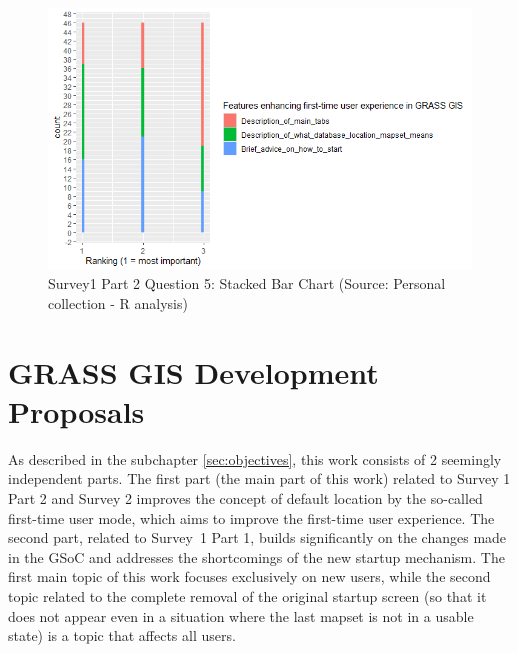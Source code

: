 \documentclass[a4paper,10pt,twoside]{article}
\begin{document}
\vspace{0.3cm}
\begin{figure}[hbt!] 
\begin{center}
\includegraphics[width=15cm]{../surveys/analyzed_data/survey1_part2_question5_histogram_r.png} 
\caption[Survey1 Part 2 Question 5: Stacked Bar Chart]{Survey1 Part 2 Question 5: Stacked Bar Chart (Source: Personal collection - R analysis)}
\label{fig:survey1_part2_question5_histogram_r}
\end{center}
\end{figure}

\newpage
\vspace*{-1cm}
\section{GRASS GIS Development Proposals}

\noindent As described in the subchapter \ref{sec:objectives}, this
work consists of 2 seemingly independent parts. The first part (the 
main part of this work) related to Survey 1 Part 2
and Survey 2 improves the concept of default location by the
so-called first-time user mode, which aims to improve the first-time
user experience. The second part, related to Survey~1 Part 1, builds 
significantly on the changes made in the GSoC and
addresses the shortcomings of the new startup mechanism. The first 
main topic of this work focuses exclusively on new users, while the
second topic related to the complete removal of the original startup
screen (so that it does not appear even in a situation where the last
mapset is not in a usable state) is a topic that affects all users.
\end{document}
